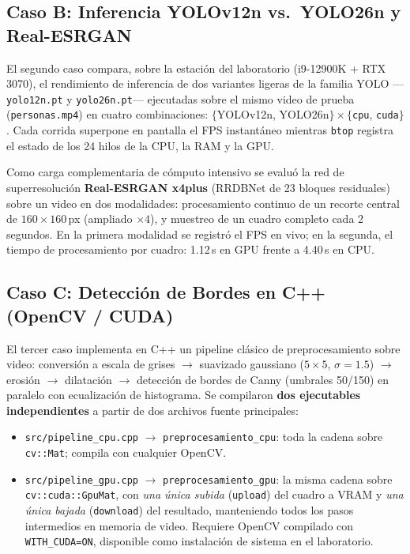 \subsection{Caso B: Inferencia YOLOv12n vs.\ YOLO26n y Real-ESRGAN}
\label{sec:casoB}

El segundo caso compara, sobre la estación del laboratorio (i9-12900K +
RTX 3070), el rendimiento de inferencia de dos variantes ligeras de la familia
YOLO ---\texttt{yolo12n.pt} y \texttt{yolo26n.pt}--- ejecutadas sobre el mismo
video de prueba (\texttt{personas.mp4}) en cuatro combinaciones:
$\{$YOLOv12n, YOLO26n$\} \times \{$\texttt{cpu}, \texttt{cuda}$\}$. Cada
corrida superpone en pantalla el FPS instantáneo mientras \texttt{btop}
registra el estado de los 24 hilos de la CPU, la RAM y la GPU.

Como carga complementaria de cómputo intensivo se evaluó la red de
superresolución \textbf{Real-ESRGAN x4plus} (RRDBNet de 23 bloques residuales)
\cite{Wang2021} sobre un video en dos modalidades: procesamiento continuo de un
recorte central de $160\times160$\,px (ampliado $\times4$), y muestreo de un
cuadro completo cada 2 segundos. En la primera modalidad se registró el FPS en
vivo; en la segunda, el tiempo de procesamiento por cuadro: 1.12\,s en GPU
frente a 4.40\,s en CPU.

\subsection{Caso C: Detección de Bordes en C++ (OpenCV / CUDA)}
\label{sec:casoC}

El tercer caso implementa en C++ un pipeline clásico de preprocesamiento sobre
video: conversión a escala de grises $\to$ suavizado gaussiano ($5\times5$,
$\sigma=1.5$) $\to$ erosión $\to$ dilatación $\to$ detección de bordes de Canny
(umbrales 50/150) \cite{Canny1986} en paralelo con ecualización de histograma.
Se compilaron \textbf{dos ejecutables independientes} a partir de dos archivos
fuente principales:

\begin{itemize}
  \item \texttt{src/pipeline\_cpu.cpp} $\to$ \texttt{preprocesamiento\_cpu}:
        toda la cadena sobre \texttt{cv::Mat}; compila con cualquier OpenCV.
  \item \texttt{src/pipeline\_gpu.cpp} $\to$ \texttt{preprocesamiento\_gpu}:
        la misma cadena sobre \texttt{cv::cuda::GpuMat}, con \emph{una única
        subida} (\texttt{upload}) del cuadro a VRAM y \emph{una única bajada}
        (\texttt{download}) del resultado, manteniendo todos los pasos
        intermedios en memoria de video. Requiere OpenCV compilado con
        \texttt{WITH\_CUDA=ON}, disponible como instalación de sistema en el
        laboratorio.
\end{itemize}


